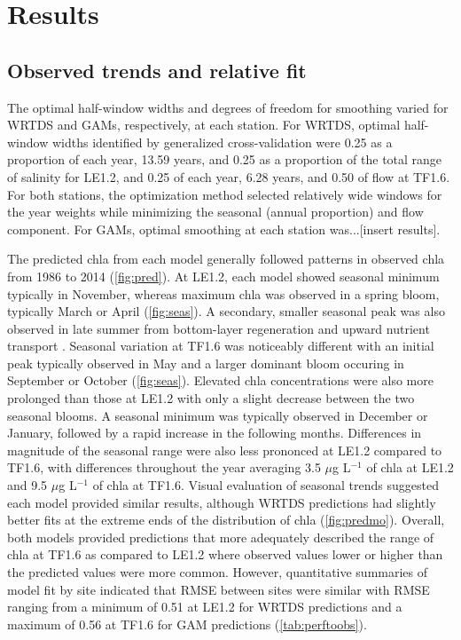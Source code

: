 \documentclass[letterpaper,12pt,oneside]{article}\usepackage[]{graphicx}\usepackage[]{color}
\newcommand{\mugl}{$\mu$g L$^{-1}$ }
\begin{document}
\section{Results}

\subsection{Observed trends and relative fit}



The optimal half-window widths and degrees of freedom for smoothing varied for \ac{WRTDS} and \acp{GAM}, respectively, at each station.  For \ac{WRTDS}, optimal half-window widths identified by generalized cross-validation were  0.25 as a proportion of each year, 13.59 years, and  0.25 as a proportion of the total range of salinity for LE1.2, and 0.25 of each year, 6.28 years, and 0.50 of flow at TF1.6.  For both stations, the optimization method selected relatively wide windows for the year weights while minimizing the seasonal (annual proportion) and flow component.  For \acp{GAM}, optimal smoothing at each station was...[insert results].     



The predicted \ac{chla} from each model generally followed patterns in observed \ac{chla} from 1986 to 2014 (\cref{fig:pred}).  At LE1.2, each model showed seasonal minimum typically in November, whereas maximum \ac{chla} was observed in a spring bloom, typically March or April (\cref{fig:seas}).  A secondary, smaller seasonal peak was also observed in late summer from bottom-layer regeneration and upward nutrient transport \citep{Testa08a}.  Seasonal variation at TF1.6 was noticeably different with an initial peak typically observed in May and a larger dominant bloom occuring in September or October (\cref{fig:seas}).  Elevated \ac{chla}  concentrations were also more prolonged than those at LE1.2 with only a slight decrease between the two seasonal blooms.  A seasonal minimum was typically observed in December or January, followed by a rapid increase in the following months.  Differences in magnitude of the seasonal range were also less prononced at LE1.2 compared to TF1.6, with differences throughout the year averaging 3.5 \mugl of \ac{chla} at LE1.2 and 9.5 \mugl of \ac{chla} at TF1.6. Visual evaluation of seasonal trends suggested each model provided similar results, although \ac{WRTDS} predictions had slightly better fits at the extreme ends of the distribution of \ac{chla} (\cref{fig:predmo}).  Overall, both models provided predictions that more adequately described the range of \ac{chla} at TF1.6 as compared to LE1.2 where observed values lower or higher than the predicted values were more common.  However, quantitative summaries of model fit by site indicated that \ac{RMSE} between sites were similar with \ac{RMSE} ranging from a minimum of 0.51 at LE1.2 for \ac{WRTDS} predictions and a maximum of 0.56 at TF1.6 for \ac{GAM} predictions (\cref{tab:perftoobs}).  
\end{document}
